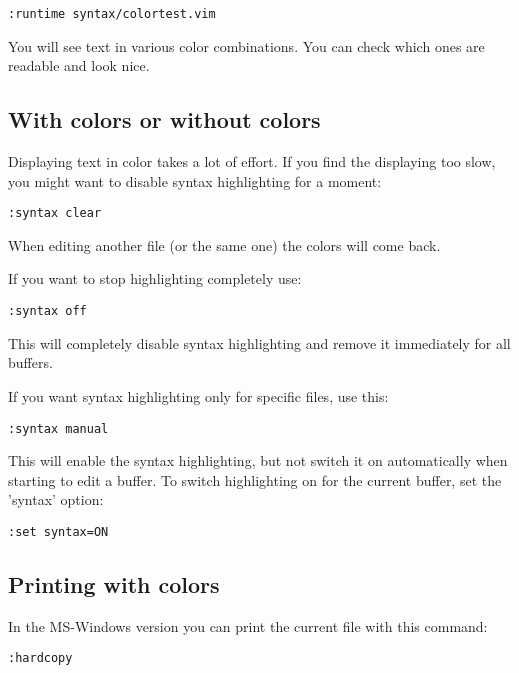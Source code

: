  \begin{Verbatim}[samepage=true]
 :runtime syntax/colortest.vim
 \end{Verbatim}

You will see text in various color combinations.
You can check which ones are readable and look nice.

\subsection{With colors or without colors}

Displaying text in color takes a lot of effort.
If you find the displaying too slow, you might want to disable syntax highlighting for a moment:

\begin{Verbatim}[samepage=true]
 :syntax clear
\end{Verbatim}

When editing another file (or the same one) the colors will come back.

\label{:syn-off}
If you want to stop highlighting completely use:

 \begin{Verbatim}[samepage=true]
 :syntax off
 \end{Verbatim}

This will completely disable syntax highlighting and remove it immediately for all buffers.

\label{:syn-manual}
If you want syntax highlighting only for specific files, use this:

 \begin{Verbatim}[samepage=true]
 :syntax manual
 \end{Verbatim}

This will enable the syntax highlighting, but not switch it on automatically when starting to edit a buffer.
To switch highlighting on for the current buffer, set the 'syntax' option:

 \begin{Verbatim}[samepage=true]
 :set syntax=ON
 \end{Verbatim}

\subsection{Printing with colors}
\label{syntax-printing}
In the MS-Windows version you can print the current file with this command:

 \begin{Verbatim}[samepage=true]
 :hardcopy
 \end{Verbatim}

